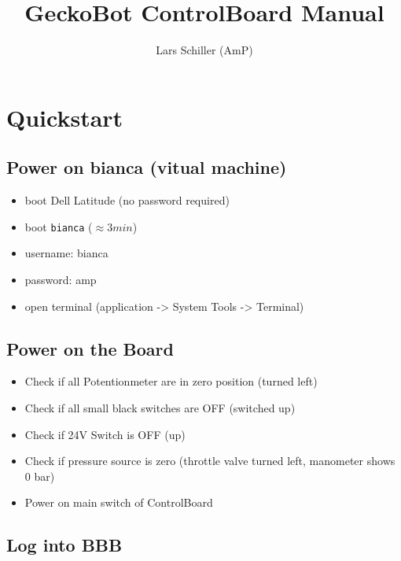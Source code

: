 \documentclass[
	fontsize=10pt
	paper=a4
]{scrartcl}
\author{Lars Schiller (AmP)}
\title{GeckoBot ControlBoard Manual}
\begin{document}
\maketitle
\tableofcontents


\clearpage
\section{Quickstart}

\subsection{Power on bianca (vitual machine)}
\begin{itemize}
	\item boot Dell Latitude (no password required)
	\item boot \texttt{bianca} ($\approx 3 min$) 
	\item username: bianca
	\item password: amp
	\item open terminal (application -> System Tools -> Terminal)
\end{itemize}


\subsection{Power on the Board}

\begin{itemize}
\item Check if all Potentionmeter are in zero position (turned left)
\item Check if all small black switches are OFF (switched up)
\item Check if 24V Switch is OFF (up)
\item Check if pressure source is zero (throttle valve turned left, manometer shows 0 bar)
\item Power on main switch of ControlBoard



\end{itemize}

\subsection{Log into BBB}
\end{document}
